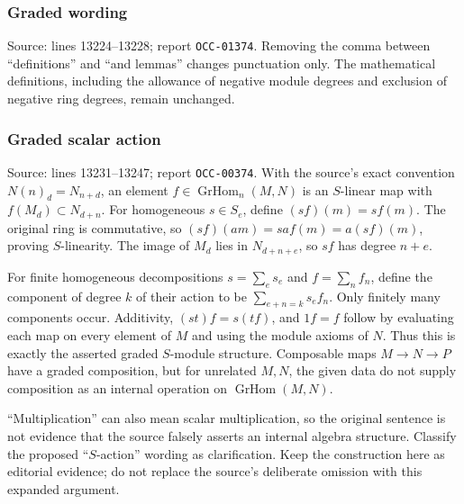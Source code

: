\subsubsection{Graded wording}\label{algebra-proof-001-graded-wording}

Source: lines 13224--13228; report \texttt{OCC-01374}. Removing the comma between ``definitions'' and ``and lemmas'' changes punctuation only. The mathematical definitions, including the allowance of negative module degrees and exclusion of negative ring degrees, remain unchanged.

\subsubsection{Graded scalar action}\label{algebra-proof-001-graded-scalar-action}

Source: lines 13231--13247; report \texttt{OCC-00374}. With the source's exact convention \(N(n)_d=N_{n+d}\), an element \(f\in\operatorname{GrHom}_n(M,N)\) is an \(S\)-linear map with \(f(M_d)\subset N_{d+n}\). For homogeneous \(s\in S_e\), define \((sf)(m)=s f(m)\). The original ring is commutative, so \((sf)(am)=sa f(m)=a(sf)(m)\), proving \(S\)-linearity. The image of \(M_d\) lies in \(N_{d+n+e}\), so \(sf\) has degree \(n+e\).

For finite homogeneous decompositions \(s=\sum_e s_e\) and \(f=\sum_n f_n\), define the component of degree \(k\) of their action to be \(\sum_{e+n=k}s_ef_n\). Only finitely many components occur. Additivity, \((st)f=s(tf)\), and \(1f=f\) follow by evaluating each map on every element of \(M\) and using the module axioms of \(N\). Thus this is exactly the asserted graded \(S\)-module structure. Composable maps \(M\to N\to P\) have a graded composition, but for unrelated \(M,N\), the given data do not supply composition as an internal operation on \(\operatorname{GrHom}(M,N)\).

``Multiplication'' can also mean scalar multiplication, so the original sentence is not evidence that the source falsely asserts an internal algebra structure. Classify the proposed ``\(S\)-action'' wording as clarification. Keep the construction here as editorial evidence; do not replace the source's deliberate omission with this expanded argument.
